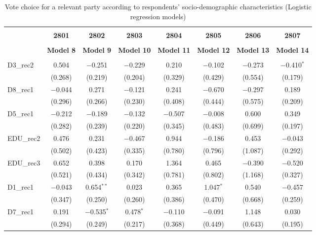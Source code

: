 \documentclass[
]{article}
\begin{document}
\begin{table}[!htbp] \centering 
  \caption{Vote choice for a relevant party according to respondents' 
                       socio-demographic characteristics (Logistic regression models)} 
  \label{table:full_logit_uk} 
\begin{tabular}{@{\extracolsep{5pt}}lccccccc} 
\\[-1.8ex]\hline \\[-1.8ex] 
 & \textbf{2801} & \textbf{2802} & \textbf{2803} & \textbf{2804} & \textbf{2805} & \textbf{2806} & \textbf{2807} \\ 
\\[-1.8ex] & \textbf{Model 8} & \textbf{Model 9} & \textbf{Model 10} & \textbf{Model 11} & \textbf{Model 12} & \textbf{Model 13} & \textbf{Model 14}\\ 
\hline \\[-1.8ex] 
 D3\_rec2 & 0.504 & $-$0.251 & $-$0.229 & 0.210 & $-$0.102 & $-$0.273 & $-$0.410$^{*}$ \\ 
  & (0.268) & (0.219) & (0.204) & (0.329) & (0.429) & (0.554) & (0.179) \\ 
  D8\_rec1 & $-$0.044 & 0.271 & $-$0.121 & 0.241 & $-$0.670 & $-$0.297 & 0.189 \\ 
  & (0.296) & (0.266) & (0.230) & (0.408) & (0.444) & (0.575) & (0.209) \\ 
  D5\_rec1 & $-$0.212 & $-$0.189 & $-$0.132 & $-$0.507 & $-$0.008 & 0.600 & 0.349 \\ 
  & (0.282) & (0.239) & (0.220) & (0.345) & (0.483) & (0.699) & (0.197) \\ 
  EDU\_rec2 & 0.476 & 0.231 & $-$0.467 & 0.944 & $-$0.186 & 0.453 & $-$0.043 \\ 
  & (0.502) & (0.423) & (0.335) & (0.780) & (0.796) & (1.087) & (0.292) \\ 
  EDU\_rec3 & 0.652 & 0.398 & 0.170 & 1.364 & 0.465 & $-$0.390 & $-$0.520 \\ 
  & (0.521) & (0.434) & (0.342) & (0.781) & (0.802) & (1.168) & (0.327) \\ 
  D1\_rec1 & $-$0.043 & 0.654$^{**}$ & 0.023 & 0.365 & 1.047$^{*}$ & 0.540 & $-$0.457 \\ 
  & (0.347) & (0.250) & (0.260) & (0.386) & (0.470) & (0.668) & (0.259) \\ 
  D7\_rec1 & 0.191 & $-$0.535$^{*}$ & 0.478$^{*}$ & $-$0.110 & $-$0.091 & 1.148 & 0.030 \\ 
  & (0.294) & (0.249) & (0.217) & (0.368) & (0.449) & (0.643) & (0.195) \\ 

\end{tabular}
\end{table}
\end{document}
